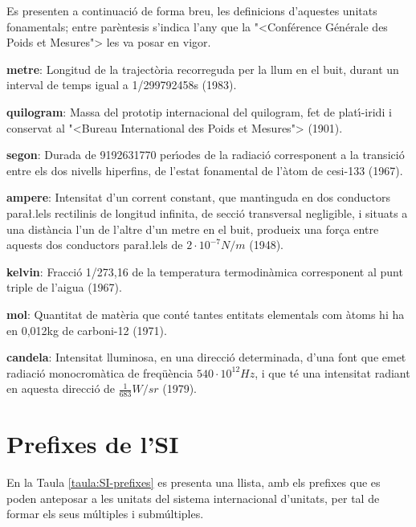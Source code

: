 Es presenten a continuaci\'{o} de forma breu, les definicions
d'aquestes unitats fonamentals; entre par\`{e}ntesis s'indica l'any 
que la {"<}Conf\'{e}rence G\'{e}n\'{e}rale des Poids et Mesures{">} les va posar en
vigor.

\begin{list}{}
   {\setlength{\labelwidth}{22mm} \setlength{\leftmargin}{22mm} \setlength{\labelsep}{2mm}}
   \item[\textbf{metre}:] Longitud de la traject\`{o}ria recorreguda per la llum
   en el buit, durant un interval de temps igual a 1/299792458\unit{s} (1983).
   \item[\textbf{quilogram}:] Massa del prototip internacional del quilogram, fet de plat\'{\i}-iridi i
    conservat al {"<}Bureau International des Poids et Mesures{">} (1901).
   \item[\textbf{segon}:] Durada de 9192631770 per\'{\i}odes de la
   radiaci\'{o} corresponent a la transici\'{o} entre els dos nivells
  hiperfins, de l'estat fonamental de l'\`{a}tom de cesi-133 (1967).
   \item[\textbf{ampere}:] Intensitat d'un corrent constant,
   que mantinguda en dos conductors para{\l.l}els rectilinis de longitud
   infinita, de secci\'{o} transversal negligible, i situats a una
   dist\`{a}ncia l'un de l'altre d'un metre en el buit, produeix una for\c{c}a entre
   aquests dos conductors para{\l.l}els de $2\cdot10^{-7}\unit{N/m}$ (1948).
   \item[\textbf{kelvin}:] Fracci\'{o} 1/273,16 de la temperatura
   termodin\`{a}mica corresponent al punt triple de l'aigua (1967).
   \item[\textbf{mol}:] Quantitat de mat\`{e}ria que cont\'{e} tantes
   entitats elementals com \`{a}toms hi ha en 0,012\unit{kg} de carboni-12 (1971).
   \item[\textbf{candela}:] Intensitat lluminosa, en una direcci\'{o} determinada,
   d'una font que emet radiaci\'{o} monocrom\`{a}tica de freq\"{u}\`{e}ncia $540\cdot10^{12}\unit{Hz}$, i
   que t\'{e} una intensitat radiant en aquesta direcci\'{o} de $\frac{1}{683}\unit{W/sr}$ (1979).
\end{list}


\section{Prefixes de l'SI}

En la Taula \vref{taula:SI-prefixes} es presenta una llista, amb els
prefixes que es poden anteposar a les unitats del sistema
internacional d'unitats, per tal de formar els seus m\'{u}ltiples i
subm\'{u}ltiples.

